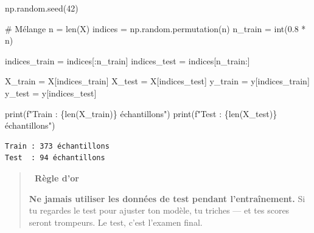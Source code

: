\documentclass[
  french,
  11pt,
  a4paper,
]{scrbook}
\newenvironment{Shaded}{}{}
\newcommand{\BuiltInTok}[1]{\textcolor[rgb]{0.84,0.23,0.29}{#1}}
\newcommand{\CommentTok}[1]{\textcolor[rgb]{0.42,0.45,0.49}{#1}}
\newcommand{\DecValTok}[1]{\textcolor[rgb]{0.00,0.36,0.77}{#1}}
\newcommand{\FloatTok}[1]{\textcolor[rgb]{0.00,0.36,0.77}{#1}}
\newcommand{\NormalTok}[1]{\textcolor[rgb]{0.14,0.16,0.18}{#1}}
\newcommand{\OperatorTok}[1]{\textcolor[rgb]{0.14,0.16,0.18}{#1}}
\newcommand{\SpecialCharTok}[1]{\textcolor[rgb]{0.00,0.36,0.77}{#1}}
\newcommand{\SpecialStringTok}[1]{\textcolor[rgb]{0.01,0.18,0.38}{#1}}
\begin{document}
\begin{tcolorbox}[enhanced jigsaw, arc=.35mm, bottomrule=.15mm, bottomtitle=1mm, breakable, colback=white, colbacktitle=quarto-callout-tip-color!10!white, colframe=quarto-callout-tip-color-frame, coltitle=black, left=2mm, leftrule=.75mm, opacityback=0, opacitybacktitle=0.6, rightrule=.15mm, title=\textcolor{quarto-callout-tip-color}{\faLightbulb}\hspace{0.5em}{✅ Corrigé Étape 3.2}, titlerule=0mm, toprule=.15mm, toptitle=1mm]

\begin{Shaded}
\begin{Highlighting}[]
\NormalTok{np.random.seed(}\DecValTok{42}\NormalTok{)}

\CommentTok{\# Mélange}
\NormalTok{n }\OperatorTok{=} \BuiltInTok{len}\NormalTok{(X)}
\NormalTok{indices }\OperatorTok{=}\NormalTok{ np.random.permutation(n)}
\NormalTok{n\_train }\OperatorTok{=} \BuiltInTok{int}\NormalTok{(}\FloatTok{0.8} \OperatorTok{*}\NormalTok{ n)}

\NormalTok{indices\_train }\OperatorTok{=}\NormalTok{ indices[:n\_train]}
\NormalTok{indices\_test }\OperatorTok{=}\NormalTok{ indices[n\_train:]}

\NormalTok{X\_train }\OperatorTok{=}\NormalTok{ X[indices\_train]}
\NormalTok{X\_test }\OperatorTok{=}\NormalTok{ X[indices\_test]}
\NormalTok{y\_train }\OperatorTok{=}\NormalTok{ y[indices\_train]}
\NormalTok{y\_test }\OperatorTok{=}\NormalTok{ y[indices\_test]}

\BuiltInTok{print}\NormalTok{(}\SpecialStringTok{f"Train : }\SpecialCharTok{\{}\BuiltInTok{len}\NormalTok{(X\_train)}\SpecialCharTok{\}}\SpecialStringTok{ échantillons"}\NormalTok{)}
\BuiltInTok{print}\NormalTok{(}\SpecialStringTok{f"Test  : }\SpecialCharTok{\{}\BuiltInTok{len}\NormalTok{(X\_test)}\SpecialCharTok{\}}\SpecialStringTok{ échantillons"}\NormalTok{)}
\end{Highlighting}
\end{Shaded}

\begin{verbatim}
Train : 373 échantillons
Test  : 94 échantillons
\end{verbatim}

\begin{quote}
\textbf{🧠 Règle d'or}

\textbf{Ne jamais utiliser les données de test pendant l'entraînement.}
Si tu regardes le test pour ajuster ton modèle, tu triches --- et tes
scores seront trompeurs. Le test, c'est l'examen final.
\end{quote}

\end{tcolorbox}
\end{document}
